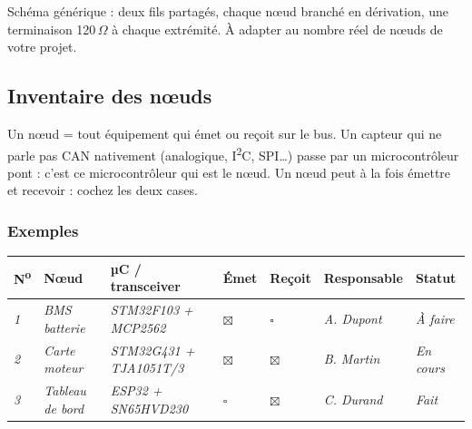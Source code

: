 \documentclass[10pt,a4paper]{article}
\newcommand{\ex}[1]{\textcolor{exgrey}{\textit{#1}}}
\let\oldsubsection\subsection
\renewcommand{\subsection}{\Needspace*{8\baselineskip}\oldsubsection}
\begin{document}
\begin{Form}
Schéma générique : deux fils partagés, chaque nœud branché en dérivation, une terminaison
120\,$\Omega$ à chaque extrémité. À adapter au nombre réel de nœuds de votre projet.

\begin{center}
\end{center}

\subsection{Inventaire des nœuds}

Un nœud = tout équipement qui émet ou reçoit sur le bus. Un capteur qui ne parle pas CAN
nativement (analogique, I\textsuperscript{2}C, SPI…) passe par un microcontrôleur pont :
c'est ce microcontrôleur qui est le nœud. Un nœud peut à la fois émettre et recevoir :
cochez les deux cases.

\subsubsection*{Exemples}
\begin{tabularx}{\textwidth}{C{0.7cm} L{3.4cm} L{3.4cm} C{1.1cm} C{1.2cm} L{2.6cm} X}
  \toprule
  \textbf{N\textsuperscript{o}} & \textbf{Nœud} & \textbf{µC / transceiver} & \textbf{Émet} & \textbf{Reçoit} & \textbf{Responsable} & \textbf{Statut} \\
  \midrule
  \ex{1} & \ex{BMS batterie} & \ex{STM32F103 + MCP2562} & \ex{$\boxtimes$} & \ex{$\square$} & \ex{A. Dupont} & \ex{À faire} \\
  \ex{2} & \ex{Carte moteur} & \ex{STM32G431 + TJA1051T/3} & \ex{$\boxtimes$} & \ex{$\boxtimes$} & \ex{B. Martin} & \ex{En cours} \\
  \ex{3} & \ex{Tableau de bord} & \ex{ESP32 + SN65HVD230} & \ex{$\square$} & \ex{$\boxtimes$} & \ex{C. Durand} & \ex{Fait} \\
  \bottomrule
\end{tabularx}


\end{Form}
\end{document}
